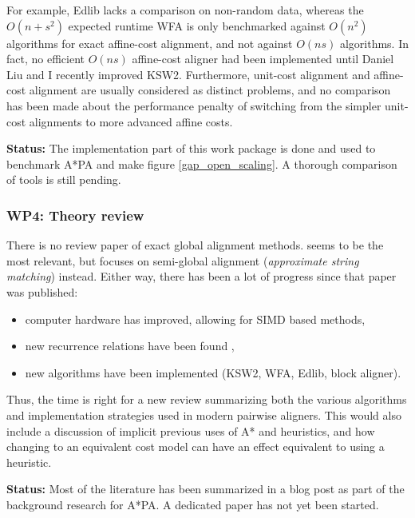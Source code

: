 \documentclass[11pt,english,a4paper]{article}
\begin{document}
For example, Edlib \autocite{edlib} lacks a comparison on non-random data, whereas
the \(O(n+s^2)\) expected runtime WFA \autocite{wfa} is only benchmarked against
\(O(n^2)\) algorithms for exact affine-cost alignment, and not against \(O(ns)\)
algorithms. In fact, no efficient \(O(ns)\) affine-cost aligner had been
implemented until Daniel Liu and I recently improved KSW2. Furthermore,
unit-cost alignment and affine-cost alignment are usually considered as distinct
problems, and no comparison has been made about the performance penalty of
switching from the simpler unit-cost alignments to more advanced affine costs.

\textbf{Status:} The implementation part of this work package is done and used to
benchmark A*PA and make figure \ref{gap_open_scaling}. A thorough comparison of tools
is still pending.

\subsubsection{WP4: Theory review}
\label{sec:org699015d}
There is no review paper of exact global alignment methods.
\textcite{navarro01} seems to be the most relevant,
but focuses on semi-global alignment (\emph{approximate string matching}) instead.
Either way, there has been a lot of progress since
that paper was published:
\begin{itemize}
\item computer hardware has improved, allowing for SIMD based methods,
\item new recurrence relations have been found \autocite{suzuki-kasahara},
\item new algorithms have been implemented (KSW2, WFA, Edlib, block aligner).
\end{itemize}
Thus, the time is right for a new review summarizing both the
various algorithms and implementation strategies used in modern pairwise
aligners.
This would also include a discussion of implicit previous uses of A* and
heuristics, and how changing to an equivalent cost model can have an effect equivalent
to using a heuristic.

\textbf{Status:} Most of the literature has been summarized in a blog post as part of
the background research for A*PA. A dedicated paper has not yet been started.
\end{document}
